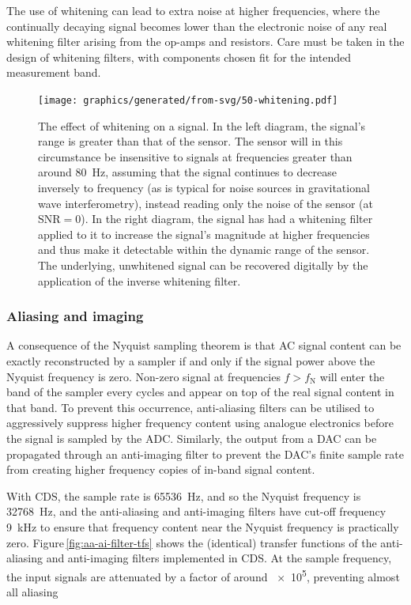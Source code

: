 The use of whitening can lead to extra noise at higher frequencies, where the continually decaying signal becomes lower than the electronic noise of any real whitening filter arising from the op-amps and resistors. Care must be taken in the design of whitening filters, with components chosen fit for the intended measurement band.

\begin{figure}
  \centering
  \texttt{[image: graphics/generated/from-svg/50-whitening.pdf]}
  \caption[The effect of whitening on a signal]{\label{fig:whitening}The effect of whitening on a signal. In the left diagram, the signal's range is greater than that of the sensor. The sensor will in this circumstance be insensitive to signals at frequencies greater than around \SI{80}{\hertz}, assuming that the signal continues to decrease inversely to frequency (as is typical for noise sources in gravitational wave interferometry), instead reading only the noise of the sensor (at $\text{SNR} = 0$). In the right diagram, the signal has had a whitening filter applied to it to increase the signal's magnitude at higher frequencies and thus make it detectable within the dynamic range of the sensor. The underlying, unwhitened signal can be recovered digitally by the application of the inverse whitening filter.}
\end{figure}


\subsubsection{Aliasing and imaging}

A consequence of the Nyquist sampling theorem is that \gls{AC} signal content can be exactly reconstructed by a sampler if and only if the signal power above the Nyquist frequency is zero. Non-zero signal at frequencies $f > f_{\text{N}}$ will enter the band of the sampler every  cycles and appear on top of the real signal content in that band. To prevent this occurrence, anti-aliasing filters can be utilised to aggressively suppress higher frequency content using analogue electronics before the signal is sampled by the \gls{ADC}. Similarly, the output from a \gls{DAC} can be propagated through an anti-imaging filter to prevent the \gls{DAC}'s finite sample rate from creating higher frequency copies of in-band signal content.

With \gls{CDS}, the sample rate is \SI{65536}{\hertz}, and so the Nyquist frequency is \SI{32768}{\hertz}, and the anti-aliasing and anti-imaging filters have cut-off frequency \SI{9}{\kilo\hertz} to ensure that frequency content near the Nyquist frequency is practically zero. Figure\,\ref{fig:aa-ai-filter-tfs} shows the (identical) transfer functions of the anti-aliasing and anti-imaging filters implemented in \gls{CDS}. At the sample frequency, the input signals are attenuated by a factor of around \SI{e5}{}, preventing almost all aliasing

